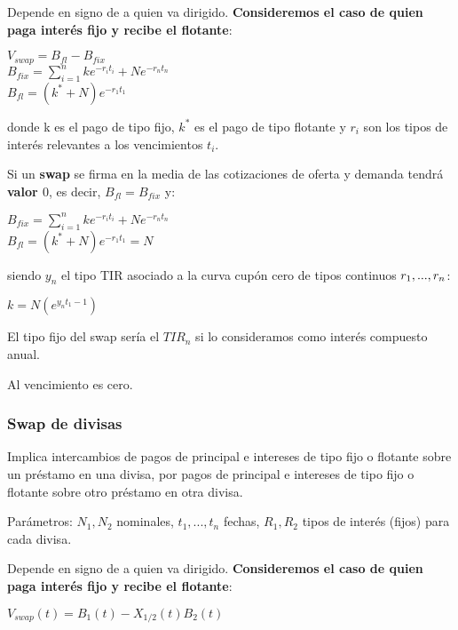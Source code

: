 \documentclass[
10pt, %
a4paper, %
oneside, %
headinclude,footinclude, %
BCOR5mm, %
]{scrartcl}
\newcommand{\n}[1]{\textbf{#1}}
\newcommand{\sub}[1]{_{#1}}
\newcommand{\pot}[1]{^{#1}}
\newcommand{\f}[1]{{\large{${#1}$}}}
\newcommand{\sumatorio}[2]{\sum_{#1}^{#2}}
\newcounter{ex}
\begin{document}

				Depende en signo de a quien va dirigido. \n{Consideremos el caso de quien paga interés fijo y recibe el flotante}:
				\begin{center} \f{V\sub{swap} = B\sub{fl} - B\sub{fix}} \\ \f{B\sub{fix} = \sumatorio{i=1}{n} ke\pot{-r\sub{i}t\sub{i}} + Ne\pot{-r\sub{n}t\sub{n}}} \\ \f{B\sub{fl} = (k\pot{*} + N) e\pot{-r\sub{1}t\sub{1}}} \end{center}

				donde k es el pago de tipo fijo, \f{k\pot{*}} es el pago de tipo flotante y \f{r\sub{i}} son los tipos de interés relevantes a los vencimientos \f{t\sub{i}}.

				Si un \n{swap} se firma en la media de las cotizaciones de oferta y demanda tendrá \n{valor \f{0}}, es decir, \f{B\sub{fl} = B\sub{fix}} y:
				\begin{center} \f{B\sub{fix} = \sumatorio{i=1}{n} ke\pot{-r\sub{i}t\sub{i}} + Ne\pot{-r\sub{n}t\sub{n}}} \\ \f{B\sub{fl} = (k\pot{*} + N) e\pot{-r\sub{1}t\sub{1}} = N} \end{center}

				siendo \f{y\sub{n}} el tipo TIR asociado a la curva cupón cero de tipos continuos \f{r\sub{1},...,r\sb{n}}: 
				\begin{center} \f{k = N (e\pot{y\sub{n}t\sub{1} - 1})} \end{center}

				El tipo fijo del swap sería el \f{TIR\sub{n}} si lo consideramos como interés compuesto anual. 

				Al vencimiento es cero.

		\subsubsection{Swap de divisas}

			Implica intercambios de pagos de principal e intereses de tipo fijo o flotante sobre un préstamo en una divisa, por pagos de principal e intereses de tipo fijo o flotante sobre otro préstamo en otra divisa.

			Parámetros: \f{N\sub{1},N\sub{2}} nominales, \f{t\sub{1},...,t\sub{n}} fechas, \f{R\sub{1}, R\sub{2}} tipos de interés (fijos) para cada divisa.


				Depende en signo de a quien va dirigido. \n{Consideremos el caso de quien paga interés fijo y recibe el flotante}:
				\begin{center} \f{V\sub{swap}(t) = B\sub{1}(t) - X\sub{1/2}(t)B\sub{2}(t)} \end{center}
\end{document}
